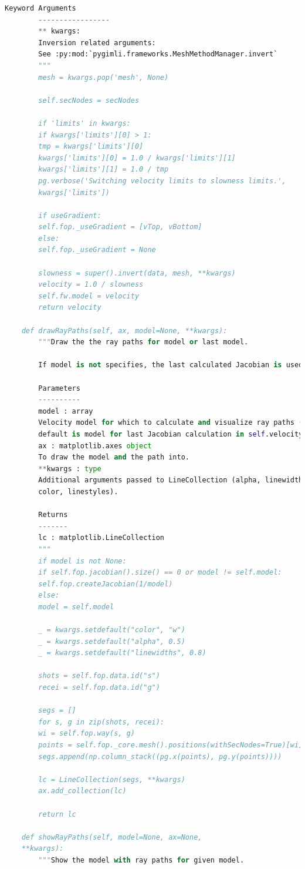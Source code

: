 \documentclass[a4paper, 12 pt]{article} %
\begin{document}
\begin{lstlisting}[language=Python, caption=Código-fonte para pygimli.physics.traveltime.TravelTimeManager]
		Keyword Arguments
		-----------------
		** kwargs:
		Inversion related arguments:
		See :py:mod:`pygimli.frameworks.MeshMethodManager.invert`
		"""
		mesh = kwargs.pop('mesh', None)
		
		self.secNodes = secNodes
		
		if 'limits' in kwargs:
		if kwargs['limits'][0] > 1:
		tmp = kwargs['limits'][0]
		kwargs['limits'][0] = 1.0 / kwargs['limits'][1]
		kwargs['limits'][1] = 1.0 / tmp
		pg.verbose('Switching velocity limits to slowness limits.',
		kwargs['limits'])
		
		if useGradient:
		self.fop._useGradient = [vTop, vBottom]
		else:
		self.fop._useGradient = None
		
		slowness = super().invert(data, mesh, **kwargs)
		velocity = 1.0 / slowness
		self.fw.model = velocity
		return velocity
		
	def drawRayPaths(self, ax, model=None, **kwargs):
		"""Draw the the ray paths for model or last model.
		
		If model is not specifies, the last calculated Jacobian is used.
		
		Parameters
		----------
		model : array
		Velocity model for which to calculate and visualize ray paths (the
		default is model for last Jacobian calculation in self.velocity).
		ax : matplotlib.axes object
		To draw the model and the path into.
		**kwargs : type
		Additional arguments passed to LineCollection (alpha, linewidths,
		color, linestyles).
		
		Returns
		-------
		lc : matplotlib.LineCollection
		"""
		if model is not None:
		if self.fop.jacobian().size() == 0 or model != self.model:
		self.fop.createJacobian(1/model)
		else:
		model = self.model
		
		_ = kwargs.setdefault("color", "w")
		_ = kwargs.setdefault("alpha", 0.5)
		_ = kwargs.setdefault("linewidths", 0.8)
		
		shots = self.fop.data.id("s")
		recei = self.fop.data.id("g")
		
		segs = []
		for s, g in zip(shots, recei):
		wi = self.fop.way(s, g)
		points = self.fop._core.mesh().positions(withSecNodes=True)[wi]
		segs.append(np.column_stack((pg.x(points), pg.y(points))))
		
		lc = LineCollection(segs, **kwargs)
		ax.add_collection(lc)
		
		return lc
		
	def showRayPaths(self, model=None, ax=None, 
	**kwargs):
		"""Show the model with ray paths for given model.
		

\end{lstlisting}
\end{document}
